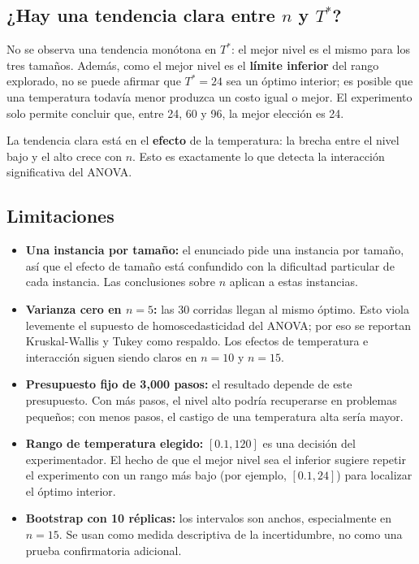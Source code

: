 \documentclass[11pt,letterpaper]{article}
\begin{document}
\subsection{¿Hay una tendencia clara entre \texorpdfstring{$n$}{n} y
\texorpdfstring{$T^*$}{T*}?}

No se observa una tendencia monótona en $T^*$: el mejor nivel es el mismo
para los tres tamaños. Además, como el mejor nivel es el \textbf{límite
inferior} del rango explorado, no se puede afirmar que $T^* = 24$ sea un
óptimo interior; es posible que una temperatura todavía menor produzca un
costo igual o mejor. El experimento solo permite concluir que, entre 24, 60 y
96, la mejor elección es 24.

La tendencia clara está en el \textbf{efecto} de la temperatura: la brecha
entre el nivel bajo y el alto crece con $n$. Esto es exactamente lo que
detecta la interacción significativa del ANOVA.

\subsection{Limitaciones}

\begin{itemize}
  \item \textbf{Una instancia por tamaño:} el enunciado pide una instancia por
        tamaño, así que el efecto de tamaño está confundido con la dificultad
        particular de cada instancia. Las conclusiones sobre $n$ aplican a
        estas instancias.
  \item \textbf{Varianza cero en $n = 5$:} las 30 corridas llegan al mismo
        óptimo. Esto viola levemente el supuesto de homoscedasticidad del
        ANOVA; por eso se reportan Kruskal-Wallis y Tukey como respaldo. Los
        efectos de temperatura e interacción siguen siendo claros en $n = 10$
        y $n = 15$.
  \item \textbf{Presupuesto fijo de 3,000 pasos:} el resultado depende de este
        presupuesto. Con más pasos, el nivel alto podría recuperarse en
        problemas pequeños; con menos pasos, el castigo de una temperatura
        alta sería mayor.
  \item \textbf{Rango de temperatura elegido:} $[0.1, 120]$ es una decisión
        del experimentador. El hecho de que el mejor nivel sea el inferior
        sugiere repetir el experimento con un rango más bajo (por ejemplo,
        $[0.1, 24]$) para localizar el óptimo interior.
  \item \textbf{Bootstrap con 10 réplicas:} los intervalos son anchos,
        especialmente en $n = 15$. Se usan como medida descriptiva de la
        incertidumbre, no como una prueba confirmatoria adicional.
\end{itemize}
\end{document}
